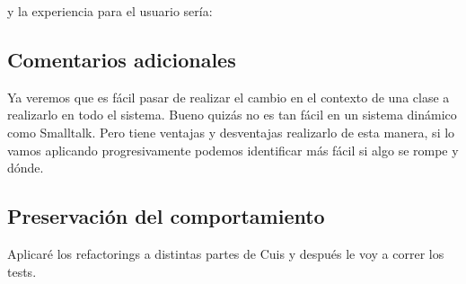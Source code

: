 
y la experiencia para el usuario sería:


\subsection{Comentarios adicionales}
Ya veremos que es fácil pasar de realizar el cambio en el contexto de una clase a realizarlo en todo
el sistema. Bueno quizás no es tan fácil en un sistema dinámico como Smalltalk. Pero tiene ventajas
y desventajas realizarlo de esta manera, si lo vamos aplicando progresivamente podemos identificar
más fácil si algo se rompe y dónde.



\subsection{Preservación del comportamiento}

Aplicaré los refactorings a distintas partes de Cuis y después le voy a correr los tests.
